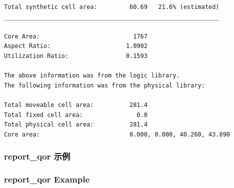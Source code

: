 \begin{lstlisting}
Total synthetic cell area:         60.69   21.6% (estimated)
____________________________________________________________

Core Area:                          1767
Aspect Ratio:                     1.0902
Utilization Ratio:                0.1593

The above information was from the logic library.
The following information was from the physical library:

Total moveable cell area:          281.4
Total fixed cell area:               0.0
Total physical cell area:          281.4
Core area:                         0.000, 0.000, 40.260, 43.890
\end{lstlisting}

\subsubsection{report\_qor 示例}
\subsubsection*{report\_qor Example}

